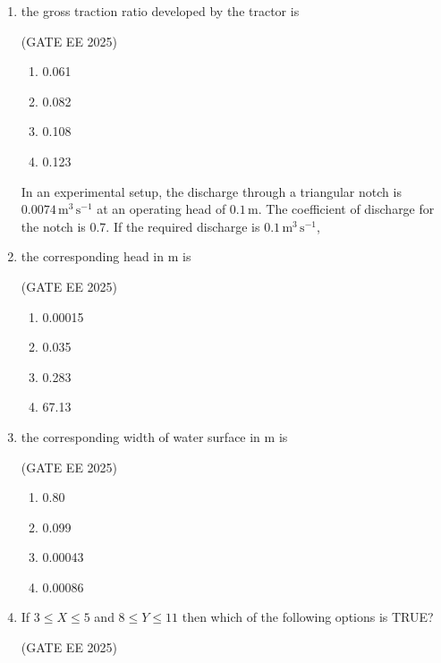 \documentclass[journal,12pt,onecolumn]{IEEEtran}
\theoremstyle{remark}
\begin{document}
\begin{enumerate}
\item the gross traction ratio developed by the tractor is\

\hfill(GATE EE 2025)

\begin{multicols}{4}
\begin{enumerate}
    \item 0.061
    \item 0.082
    \item 0.108
    \item 0.123
\end{enumerate}
\end{multicols}

In an experimental setup, the discharge through a triangular notch is $0.0074\,\mathrm{m^{3}\,s^{-1}}$ at an operating head of $0.1\,\mathrm{m}$. The coefficient of discharge for the notch is 0.7. If the required discharge is $0.1\,\mathrm{m^{3}\,s^{-1}}$,

\item the corresponding head in m is\

\hfill(GATE EE 2025)

\begin{multicols}{4}
    \begin{enumerate}
        \item 0.00015
        \item 0.035
        \item 0.283
        \item 67.13
    \end{enumerate}
\end{multicols}

\item the corresponding width of water surface in m is\

\hfill(GATE EE 2025)

\begin{multicols}{4}
    \begin{enumerate}
        \item 0.80
        \item 0.099
        \item 0.00043
        \item 0.00086
    \end{enumerate}
\end{multicols}

\item If $3\le X\le 5$ and $8\le Y\le 11$ then which of the following options is TRUE?\

\hfill(GATE EE 2025)


\end{enumerate}
\end{document}
